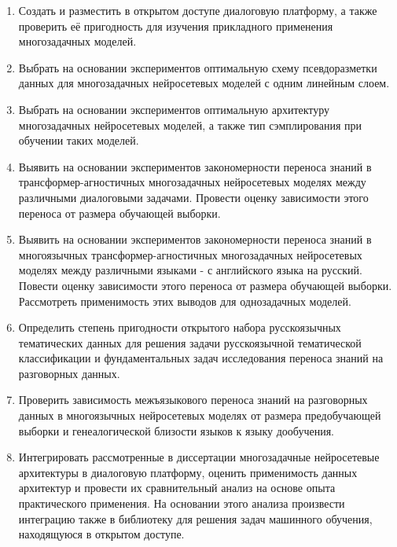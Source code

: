 \begin{enumerate}
  \item {Создать и разместить в открытом доступе диалоговую платформу, а также проверить её пригодность для изучения прикладного применения многозадачных моделей.}
  \item {Выбрать на основании экспериментов оптимальную схему псевдоразметки данных для многозадачных нейросетевых моделей с одним линейным слоем.}
  \item {Выбрать на основании экспериментов оптимальную архитектуру многозадачных нейросетевых моделей, а также тип сэмплирования при обучении таких моделей.}
  \item {Выявить на основании экспериментов закономерности переноса знаний в трансформер-агностичных многозадачных нейросетевых моделях между различными диалоговыми задачами. Провести оценку зависимости этого переноса от размера обучающей выборки.}
  \item {Выявить на основании экспериментов закономерности переноса знаний в многоязычных трансформер-агностичных многозадачных нейросетевых моделях между различными языками - с английского языка на русский. Повести оценку зависимости этого переноса от размера обучающей выборки. Рассмотреть применимость этих выводов для однозадачных моделей.}
  \item {Определить степень пригодности  открытого набора русскоязычных тематических данных для решения задачи русскоязычной тематической классификации и фундаментальных задач исследования переноса знаний на разговорных данных.}
  \item {Проверить зависимость межъязыкового переноса знаний на разговорных данных в многоязычных нейросетевых моделях от размера предобучающей выборки и генеалогической близости языков к языку дообучения.}
  \item {Интегрировать рассмотренные в диссертации многозадачные нейросетевые архитектуры в диалоговую платформу, оценить применимость данных архитектур и провести их сравнительный анализ на основе опыта практического применения. На основании этого анализа произвести интеграцию также в библиотеку для решения задач машинного обучения, находящуюся в открытом доступе.}
  \newline
  \newline
\end{enumerate}


